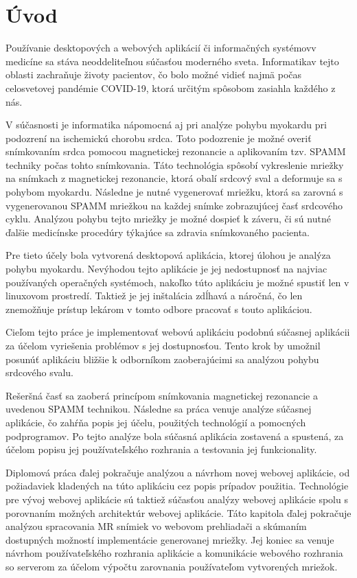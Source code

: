 \chapter {Úvod}
Používanie desktopových a webových aplikácií či informačných systémov\newline v medicíne sa stáva neoddeliteľnou súčasťou moderného sveta. Informatika\newline v tejto oblasti zachraňuje životy pacientov, čo bolo možné vidieť najmä počas celosvetovej pandémie COVID-19, ktorá určitým spôsobom zasiahla každého z nás.

V súčasnosti je informatika nápomocná aj pri analýze pohybu myokardu pri podozrení na ischemickú chorobu srdca. Toto podozrenie je možné overiť snímkovaním srdca pomocou magnetickej rezonancie a aplikovaním tzv. SPAMM techniky počas tohto snímkovania. Táto technológia spôsobí vykreslenie mriežky na snímkach z magnetickej rezonancie, ktorá obalí srdcový sval a deformuje sa s pohybom myokardu. Následne je nutné vygenerovať mriežku, ktorá sa zarovná s vygenerovanou SPAMM mriežkou na každej snímke zobrazujúcej časť srdcového cyklu. Analýzou pohybu tejto mriežky je možné dospieť k záveru, či sú nutné ďalšie medicínske procedúry týkajúce sa zdravia snímkovaného pacienta.

Pre tieto účely bola vytvorená desktopová aplikácia, ktorej úlohou je analýza pohybu myokardu. Nevýhodou tejto aplikácie je jej nedostupnosť na najviac používaných operačných systémoch, nakoľko túto aplikáciu je možné spustiť len v linuxovom prostredí. Taktiež je jej inštalácia zdĺhavá a náročná, čo len znemožňuje prístup lekárom v tomto odbore pracovať s touto aplikáciou.

Cieľom tejto práce je implementovať webovú aplikáciu podobnú súčasnej aplikácii za účelom vyriešenia problémov s jej dostupnosťou. Tento krok by umožnil posunúť aplikáciu bližšie k odborníkom zaoberajúcimi sa analýzou pohybu srdcového svalu.

Rešeršná časť sa zaoberá princípom snímkovania magnetickej rezonancie a uvedenou SPAMM technikou. Následne sa práca venuje analýze súčasnej aplikácie, čo zahŕňa popis jej účelu, použitých technológií a pomocných podprogramov. Po tejto analýze bola súčasná aplikácia zostavená a spustená, za účelom popisu jej používateľského rozhrania a testovania jej funkcionality.

Diplomová práca ďalej pokračuje analýzou a návrhom novej webovej aplikácie, od požiadaviek kladených na túto aplikáciu cez popis prípadov použitia. Technológie pre vývoj webovej aplikácie sú taktiež súčasťou analýzy webovej aplikácie spolu s porovnaním možných architektúr webovej aplikácie.  Táto kapitola ďalej pokračuje analýzou spracovania MR snímiek vo webovom prehliadači a skúmaním dostupných možností implementácie generovanej mriežky. Jej koniec sa venuje návrhom používateľského rozhrania aplikácie a komunikácie webového rozhrania so serverom za účelom výpočtu zarovnania používateľom vytvorených mriežok.

